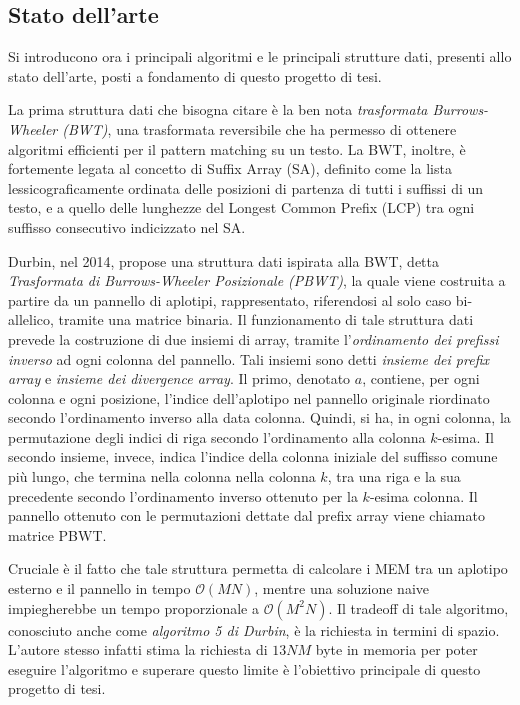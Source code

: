 \documentclass[a4paper,11pt, oneside,italian]{article}
\begin{document}
\subsection*{Stato dell'arte}
Si introducono ora i principali algoritmi e le principali strutture dati,
presenti allo stato dell'arte, posti a fondamento di questo progetto di tesi.

La prima struttura dati che bisogna citare è la  ben nota \textit{trasformata
  Burrows-Wheeler (BWT)}, una trasformata reversibile che ha permesso di
ottenere algoritmi efficienti per il pattern matching su un testo.
La BWT, inoltre, è fortemente legata al concetto di Suffix Array (SA), definito
come la lista lessicograficamente ordinata delle posizioni di partenza di 
tutti i suffissi di un testo, e a quello delle lunghezze del Longest Common
Prefix (LCP) tra ogni suffisso consecutivo indicizzato nel SA.

Durbin, nel 2014, propose una struttura dati ispirata alla BWT, detta
\textit{Trasformata di Burrows-Wheeler Posizionale (PBWT)}, la quale viene
costruita a partire da un pannello di aplotipi, rappresentato, riferendosi al
solo caso bi-allelico, tramite una matrice binaria. Il funzionamento di tale
struttura dati prevede la costruzione di due insiemi di array, tramite
l'\textit{ordinamento dei prefissi inverso} ad ogni colonna del pannello.
Tali insiemi sono detti \textit{insieme dei prefix array} e \textit{insieme dei
  divergence array}. Il primo, denotato $a$, contiene, per ogni colonna e ogni
posizione, l'indice dell'aplotipo nel pannello originale riordinato secondo
l'ordinamento inverso alla data colonna. Quindi, si ha, in ogni colonna, la
permutazione degli indici di riga secondo l'ordinamento alla colonna $k$-esima.
Il secondo insieme, invece, indica l'indice della colonna iniziale del suffisso
comune più lungo, che termina nella colonna nella colonna $k$, tra una riga e la
sua precedente secondo l'ordinamento inverso ottenuto per la $k$-esima colonna.
Il pannello ottenuto con le permutazioni dettate dal prefix array viene chiamato
matrice PBWT.

Cruciale è il fatto che tale struttura permetta di calcolare i MEM tra
un aplotipo esterno e il pannello in tempo $\mathcal{O}(MN)$, mentre 
una soluzione naive impiegherebbe un tempo proporzionale a
$\mathcal{O}(M^2N)$. Il tradeoff di tale algoritmo, conosciuto anche come
\textit{algoritmo 5 di Durbin}, è la richiesta in termini di spazio. L'autore
stesso infatti stima la richiesta di $13NM$ byte in memoria per poter eseguire
l'algoritmo e superare questo limite è l'obiettivo principale di questo progetto
di tesi. 
\end{document}
